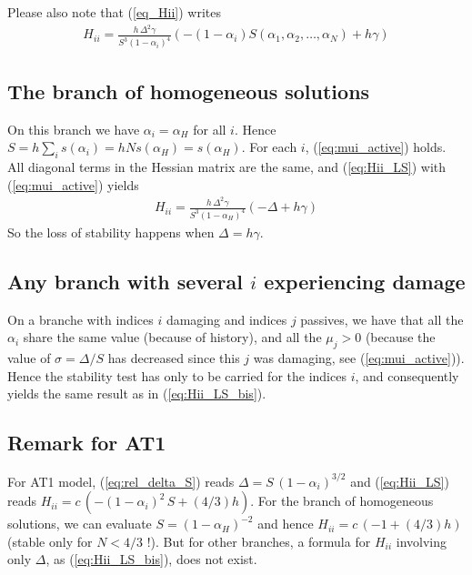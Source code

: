 \documentclass[final,3p,times,authoryear]{elsarticle}
\begin{document}
Please also note that (\ref{eq_Hii}) writes
\begin{align}
\label{eq:Hii_LS}
H_{ii} = \frac{h \, \Delta^2 \gamma}{S^3 (1-\alpha_i)^4} \left( -(1-\alpha_i) S(\alpha_1, \alpha_2, \ldots, \alpha_N) + h \gamma \right)
\end{align}

\subsection{The branch of homogeneous solutions}
On this branch we have $\alpha_i = \alpha_H$ for all $i$.
Hence $S=h \sum_i s(\alpha_i) = h N s(\alpha_H)=s(\alpha_H)$.
For each $i$, (\ref{eq:mui_active}) holds.
All diagonal terms in the Hessian matrix are the same, and (\ref{eq:Hii_LS}) with (\ref{eq:mui_active}) yields
\begin{align}
\label{eq:Hii_LS_bis}
H_{ii} = \frac{h \, \Delta^2 \gamma}{S^3 (1-\alpha_H)^4} \left( -\Delta + h \gamma \right)
\end{align}
So the loss of stability happens when $\Delta = h \gamma$.

\subsection{Any branch with several $i$ experiencing damage}
On a branche with indices $i$ damaging and indices $j$ passives, we have that all the $\alpha_i$ share the same value (because of history), and all the $\mu_j>0$ (because the value of $\sigma=\Delta/S$ has decreased since this $j$ was damaging, see (\ref{eq:mui_active})). 
Hence the stability test has only to be carried for the indices $i$, and consequently yields the same result as in (\ref{eq:Hii_LS_bis}).

\subsection{Remark for AT1}
For AT1 model, (\ref{eq:rel_delta_S}) reads $\Delta = S \, (1-\alpha_i)^{3/2}$ and (\ref{eq:Hii_LS}) reads $H_{ii} = c \, (-(1-\alpha_i)^2 \, S + (4/3) h)$. 
For the branch of homogeneous solutions, we can evaluate $S=(1-\alpha_H)^{-2}$ and hence $H_{ii} = c \, (-1 + (4/3) h)$ (stable only for $N<4/3$ !).
But for other branches, a formula for $H_{ii}$ involving  only $\Delta$, as (\ref{eq:Hii_LS_bis}), does not exist.







%
%
%
%
%
%
%
%
%





\end{document}
